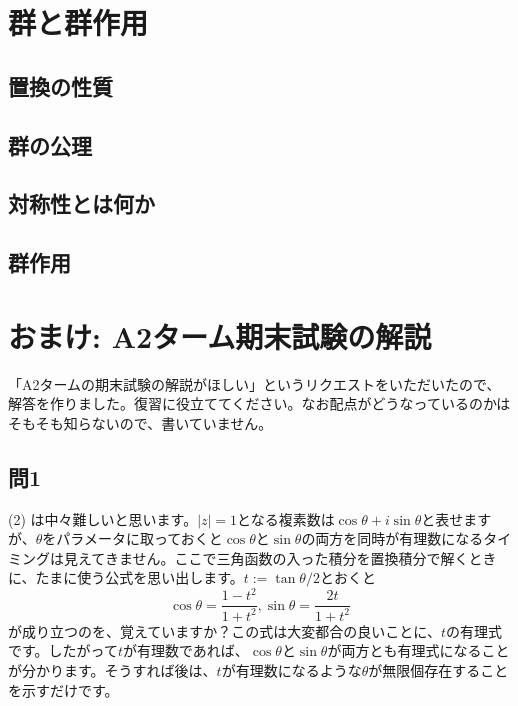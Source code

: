 \section{群と群作用}

\subsection{置換の性質}

\subsection{群の公理}


\subsection{対称性とは何か}

\subsection{群作用}



\section{おまけ: A2ターム期末試験の解説}

「A2タームの期末試験の解説がほしい」というリクエストをいただいたので、解答を作りました。復習に役立ててください。なお配点がどうなっているのかはそもそも知らないので、書いていません。

\subsection{問1}

(2) は中々難しいと思います。$|z| = 1$となる複素数は$\cos\theta + i \sin\theta$と表せますが、$\theta$をパラメータに取っておくと$\cos \theta$と$\sin \theta$の両方を同時が有理数になるタイミングは見えてきません。ここで三角函数の入った積分を置換積分で解くときに、たまに使う公式を思い出します。$t := \tan \theta/2$とおくと
\[
\cos \theta = \frac{1 - t^2}{1 + t^2}, \sin \theta = \frac{2t}{1 + t^2}
\]
が成り立つのを、覚えていますか？この式は大変都合の良いことに、$t$の有理式です。したがって$t$が有理数であれば、$\cos \theta$と$\sin \theta$が両方とも有理式になることが分かります。そうすれば後は、$t$が有理数になるような$\theta$が無限個存在することを示すだけです。

